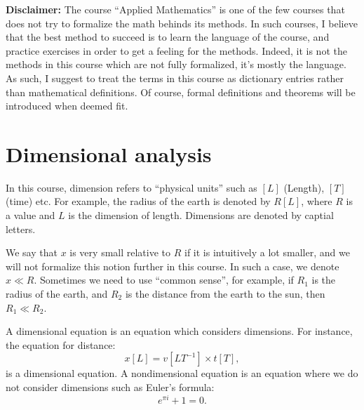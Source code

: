 \documentclass[11pt,a4paper]{article}
\begin{document}
\maketitle


\newpage
\tableofcontents
\newpage

\textbf{Disclaimer:} The course ``Applied Mathematics'' is one of the few courses
that does not try to formalize the math behinds its methods.
In such courses, I believe that the best method to succeed is to
learn the language of the course, and practice exercises in order
to get a feeling for the methods.
Indeed, it is not the methods in this course which are not fully formalized,
it's mostly the language.
As such, I suggest to treat the terms in this course as dictionary entries
rather than mathematical definitions.
Of course, formal definitions and theorems will be introduced when
deemed fit.

\section{Dimensional analysis}

\begin{entry}[Dimension]
  In this course, dimension refers to ``physical units''
  such as $[L]$ (Length), $[T]$ (time) etc.
  For example, the radius of the earth is denoted by $R[L]$,
  where $R$ is a value and $L$ is the dimension of length.
  Dimensions are denoted by captial letters.
\end{entry}

\begin{entry}
  We say that $x$ is very small relative to $R$ if it is intuitively a lot
  smaller, and we will not formalize this notion further in this course.
  In such a case, we denote $x \ll R$.
  Sometimes we need to use ``common sense'',
  for example, if $R_1$ is the radius of the earth, and $R_2$
  is the distance from the earth to the sun, then $R_1 \ll R_2$.
\end{entry}

\begin{entry}
  A dimensional equation is an equation which considers dimensions.
  For instance, the equation for distance:
  \[
    x[L] = v[L T^{-1}] \times t[T],
  \]
  is a dimensional equation.
  A nondimensional equation is an equation where we do not consider dimensions
  such as Euler's formula:
  \[
    e^{\pi i} + 1 = 0.
  \]
\end{entry}
\end{document}

